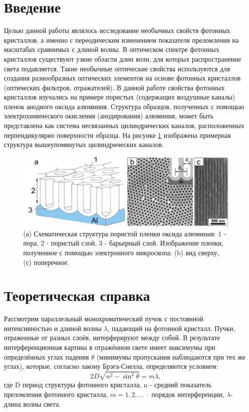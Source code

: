 \documentclass[a4paper, 12pt]{article}
\begin{document}
	\section*{Введение}
	Целью данной работы являлось исследование необычных свойств фотонных кристаллов, а именно с переодическим изменением показателя преломления на масштабах сравнимых с длиной волны. В оптическом спектре фотонных кристаллов существуют узкие области длин волн, для которых распространение света подавляется. Такие необычные оптические свойства используются для создания разнообразных оптических элементов на основе фотонных кристаллов (оптических фильтров, отражателей).
	В данной работе свойства фотонных кристаллов изучались на примере пористых (содержащих воздушные каналы) пленок анодного оксида алюминия. Структура образцов, полученных с помощью электрохимического окисления (анодирования) алюминия, может быть представлена как система несвязанных цилиндрических каналов, расположенных перпендикулярно поверхности образца. На рисунке \ref{fig:1} изображена примерная структура вышеупомянутых цилиндрических каналов.
	\begin{figure}[H]
		\centering
		\includegraphics[width=1\linewidth]{Struct.png}
		\caption{(а) Схематическая структура пористой пленки оксида алюминия: 1 - пора, 2 - пористый слой, 3 - барьерный слой. Изображение пленки, полученное с помощью электронного микроскопа: (b) вид сверху, (с) поперечное.}
		\label{fig:1}
	\end{figure}
	\section*{Теоретическая справка}
	Рассмотрим параллельный монохроматический пучок с постоянной интенсивностью и длиной волны $\lambda$, падающий на фотонной кристалл. Пучки, отраженные от разных слоёв, интерферируют между собой. В результате интерференционная картина в отражённом свете имеет максимумы при определённых углах падения $\theta$ (минимумы пропускания наблюдаются при тех же углах), которые, согласно закону Брэга-Снелла, определяются условием:
	\begin{equation}\label{bg}
	2D\sqrt{n^{2}-\sin^{2}{\theta}}  =  m\lambda,
	\end{equation}
	где D период структуры фотонного кристалла, n - средний показатель преломления фотонного кристалла, $m= 1,2, ...$ – порядок интерференции, $\lambda$- длина волны света.
	
\end{document}
